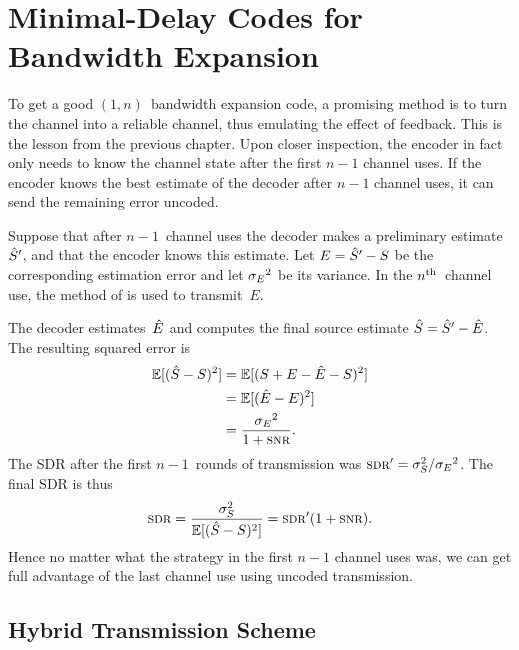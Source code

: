 \chapter{Minimal-Delay Codes for Bandwidth Expansion}

To get a good $(1,n)$~bandwidth expansion code, a promising method is to turn
the channel into a reliable channel, thus emulating the effect of feedback. This
is the lesson from the previous chapter. Upon closer inspection, the encoder in
fact only needs to know the channel state after the first $n-1$ channel uses. If
the encoder knows the best estimate of the decoder after $n-1$ channel uses, it
can send the remaining error uncoded. 

Suppose that after $n-1$~channel uses the decoder makes a preliminary
estimate~${\hat{S}}'$, and that the encoder knows this estimate. Let $E = {\hat{S}}' - S$ be
the corresponding estimation error and let ${{\sigma_E}^2}$ be its variance. In the
$n{^{\text{th}}}$~channel use, the method of  is used to transmit~$E$.

The decoder estimates~$\hat{E}$ and computes the final source estimate ${\hat{S}} = {\hat{S}}' -
\hat{E}$. The resulting squared error is
\begin{align*}
  \E[(\Sh - S)^2] &= \E[(S + E - \Eh - S)^2] \\
  &= \E[(\Eh - E)^2] \\
  &= \frac{\seq}{1 + \snr}.
\end{align*}
The SDR after the first $n-1$~rounds of transmission was $\sdr' = \ssq/\seq$.
The final SDR is thus
\begin{equation*}
  \sdr = \frac{\ssq}{\E[(\Sh - S)^2]} = \sdr' (1 + \snr).
\end{equation*}
Hence no matter what the strategy in the first $n-1$ channel uses was, we can
get full advantage of the last channel use using uncoded transmission.





\section{Hybrid Transmission Scheme}\label{sec:hybridscheme}

